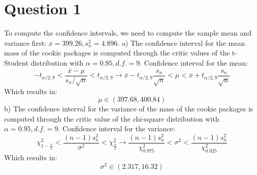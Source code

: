 \documentclass{article}
\date{November 2024}
\begin{document}
\maketitle

\section{Question 1}
To compute the confidence intervals, we need to compute the sample mean and variance first: \( \overline{x}=399.26, s_n^2=4.896\). 
a) The confidence interval for the mean mass of the cookie packages is computed through the critic values of the t-Student distribution with \(\alpha=0.95,d.f.=9\).
Confidence interval for the mean:\[
-t_{\alpha/2,9} < \frac{\overline{x}-\mu}{s_n/\sqrt{n}}<t_{\alpha/2,9} \rightarrow \overline{x}-t_{\alpha/2,9}\frac{s_n}{\sqrt{n}}<\mu<\overline{x}+t_{\alpha/2,9}\frac{s_n}{\sqrt{n}}
\]
Which results in:\[
\mu \in (397.68, 400.84)
\]
b) The confidence interval for the variance of the mass of the cookie packages is computed through the critic value of the chi-square distribution with \(\alpha=0.95,d.f.=9\).
Confidence interval for the variance:\[
\chi^2_{1-\frac{\alpha}{2}}<\frac{(n-1)s_n^2}{\sigma^2}<\chi^2_{\frac{\alpha}{2}} \rightarrow \frac{(n-1)s_n^2}{\chi^2_{0.975}}<\sigma^2<\frac{(n-1)s_n^2}{\chi^2_{0.025}}
\]
Which results in:\[
\sigma^2 \in (2.317, 16.32)
\]
\end{document}
